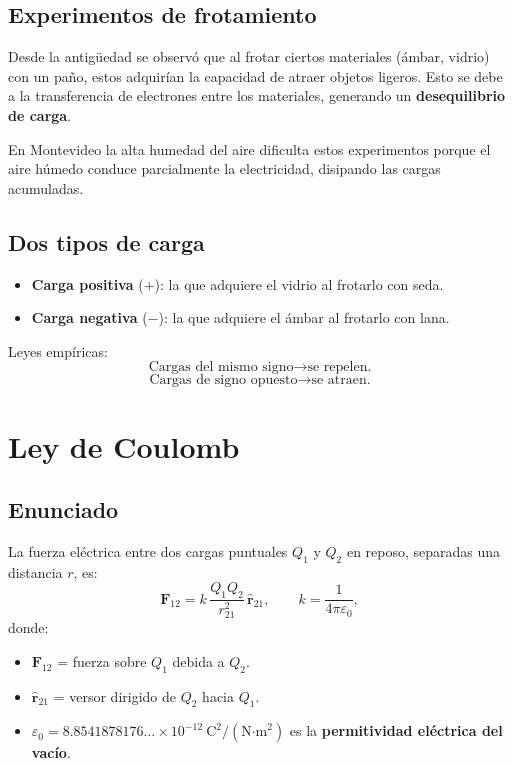 \documentclass[12pt,a4paper]{article}
\begin{document}
\subsection{Experimentos de frotamiento}

Desde la antigüedad se observó que al frotar ciertos materiales (ámbar, vidrio) con un paño, estos adquirían la capacidad de atraer objetos ligeros. Esto se debe a la transferencia de electrones entre los materiales, generando un \textbf{desequilibrio de carga}.

\begin{warnbox}
En Montevideo la alta humedad del aire dificulta estos experimentos porque el aire húmedo conduce parcialmente la electricidad, disipando las cargas acumuladas.
\end{warnbox}

\subsection{Dos tipos de carga}

\begin{itemize}[nosep]
  \item \textbf{Carga positiva} ($+$): la que adquiere el vidrio al frotarlo con seda.
  \item \textbf{Carga negativa} ($-$): la que adquiere el ámbar al frotarlo con lana.
\end{itemize}

Leyes empíricas:
\[
\text{Cargas del mismo signo} \to \text{se repelen.}
\]
\[
\text{Cargas de signo opuesto} \to \text{se atraen.}
\]

\section{Ley de Coulomb}

\subsection{Enunciado}

\begin{keybox}
La fuerza eléctrica entre dos cargas puntuales $Q_1$ y $Q_2$ en reposo, separadas una distancia $r$, es:
\[
\boxed{\mathbf{F}_{12} = k\,\frac{Q_1 Q_2}{r_{21}^2}\,\hat{\mathbf{r}}_{21}},
\qquad k = \frac{1}{4\pi\varepsilon_0},
\]
donde:
\begin{itemize}[nosep]
  \item $\mathbf{F}_{12}$ = fuerza sobre $Q_1$ debida a $Q_2$.
  \item $\hat{\mathbf{r}}_{21}$ = versor dirigido de $Q_2$ hacia $Q_1$.
  \item $\varepsilon_0 = 8.8541878176\dots\times10^{-12}\ \text{C}^2/(\text{N·m}^2)$ es la \textbf{permitividad eléctrica del vacío}.
\end{itemize}
\end{keybox}
\end{document}
